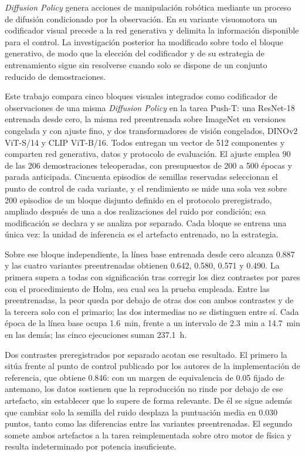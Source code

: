 
\textit{Diffusion Policy} genera acciones de manipulaci\'on rob\'otica mediante un proceso
de difusi\'on condicionado por la observaci\'on. En su variante visuomotora un codificador
visual precede a la red generativa y delimita la informaci\'on disponible para el control.
La investigaci\'on posterior ha modificado sobre todo el bloque generativo, de modo que la
elecci\'on del codificador y de su estrategia de entrenamiento sigue sin resolverse cuando
solo se dispone de un conjunto reducido de demostraciones.

Este trabajo compara cinco bloques visuales integrados como codificador de observaciones de
una misma \textit{Diffusion Policy} en la tarea Push-T: una ResNet-18 entrenada desde cero,
la misma red preentrenada sobre ImageNet en versiones congelada y con ajuste fino, y dos
transformadores de visi\'on congelados, DINOv2 ViT-S/14 y CLIP ViT-B/16. Todos entregan un
vector de \num{512} componentes y comparten red generativa, datos y protocolo de
evaluaci\'on. El ajuste emplea \num{90} de las \num{206} demostraciones teleoperadas, con
presupuestos de \num{200} a \num{500} \'epocas y parada anticipada. Cincuenta episodios de
semillas reservadas seleccionan el punto de control de cada variante, y el rendimiento se
mide una sola vez sobre \num{200} episodios de un bloque disjunto definido en el protocolo
preregistrado, ampliado despu\'es de una a dos realizaciones del ruido por condici\'on;
esa modificaci\'on se declara y se analiza por separado. Cada bloque se entrena una \'unica
vez: la unidad de inferencia es el artefacto entrenado, no la estrategia.

Sobre ese bloque independiente, la l\'inea base entrenada desde cero alcanza \num{0.887} y
las cuatro variantes preentrenadas obtienen \num{0.642}, \num{0.580}, \num{0.571} y
\num{0.490}. La primera supera a todas con significaci\'on tras corregir los diez contrastes
por pares con el procedimiento de Holm, sea cual sea la prueba empleada. Entre las
preentrenadas, la peor queda por debajo de otras dos con ambos contrastes y de la tercera
solo con el primario; las dos intermedias no se distinguen entre s\'i. Cada \'epoca de la
l\'inea base ocupa \SI{1.6}{\minute}, frente a un intervalo de \SI{2.3}{\minute} a
\SI{14.7}{\minute} en las dem\'as; las cinco ejecuciones suman \SI{237.1}{\hour}.

Dos contrastes preregistrados por separado acotan ese resultado. El primero la sit\'ua
frente al punto de control publicado por los autores de la implementaci\'on de referencia,
que obtiene
\num{0.846}: con un margen de equivalencia de \num{0.05} fijado de antemano, los datos
sostienen que la reproducci\'on no rinde por debajo de ese artefacto, sin establecer que lo
supere de forma relevante. De \'el se sigue adem\'as que cambiar solo la semilla del ruido
desplaza la puntuaci\'on media en \num{0.030} puntos, tanto como las diferencias entre las
variantes preentrenadas. El segundo somete ambos artefactos a la tarea reimplementada sobre
otro motor de f\'isica y resulta indeterminado por potencia insuficiente.

